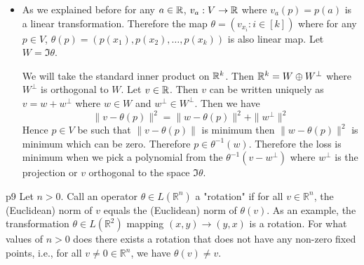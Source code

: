\documentclass[a4paper, 11pt]{article}
\newcounter{problem}
\begin{document}
{\begin{itemize}
Now for any $a\in \bbR$, consider the map $v_a: V\to \bbR$ where $v_a(p)=p(a)$. Now for any $p,q\in V$, $v_a(p+q)=(p+q)(a)=p(a)+q(a)=v_a(p)+v_a(q)$. Therefore $v_a$ is a linear map. Now the consider the map $\theta:V\to\bbR^k$ where $$\theta(p)=(v_{x_i}(p)\colon i\in [k])$$Therefore $\theta$ is also a linear map between the vector spaces $V$ and $\bbR^k$.

 Suppose all the values are 0. Then the set of polynomials of $V$ for which the loss function is 0 is  exactly the polynomials whose evaluations at $x_i$ is 0 for all $i\in[k]$. Hence the set of polynomials in $V$ for which the loss function is 0 is $\ker \theta$. Since $\ker\theta$ is a subspace of $V$
 \item As we explained before for any  $a\in \bbR$, $v_a:V\to \bbR$ where $v_a(p)=p(a)$ is a linear transformation. Therefore the map $\theta=(v_{x_i}\colon i\in [k])$ where for any $p\in V$, $\theta(p)=(p(x_1),p(x_2),\dots, p(x_k))$ is also linear map. Let $W=\Im \theta$.\parinn
 
 We will take the standard inner product on $\bbR^k$. Then $\mathbb{R}^k=W\oplus W^{\perp}$ where $W^{\perp}$ is orthogonal to $W$. Let $v\in \mathbb{R}$. Then $v$ can be written uniquely as $v=w+w^{\perp}$ where $w\in W$ and $w^{\perp}\in W^{\perp}$. Then we have $$\|v-\theta(p)\|^2=\|w-\theta(p)\|^2+\|w^{\perp}\|^2$$Hence $p\in V$ be such that  $\|v-\theta(p)\|$ is minimum then $\|w-\theta(p)\|^2$ is minimum which can be zero. Therefore $p\in\theta^{-1}(w)$. Therefore the loss is minimum when we pick a polynomial from the $\theta^{-1}(v-w^{\perp})$ where $w^{\perp}$ is the  projection or $v$ orthogonal to the space $\Im\theta$. 
\end{itemize}
}

\begin{problem}{%
	}{p9%
	}
Let $n>0$. Call an operator $\theta \in L\left(\mathbb{R}^n\right)$ a "rotation" if for all $v \in \mathbb{R}^n$, the (Euclidean) norm of $v$ equals the (Euclidean) norm of $\theta(v)$. As an example, the transformation $\theta \in L\left(\mathbb{R}^2\right)$ mapping $(x, y) \rightarrow(y, x)$ is a rotation. For what values of $n>0$ does there exists a rotation that does not have any non-zero fixed points, i.e., for all $v \neq 0 \in \mathbb{R}^n$, we have $\theta(v) \neq v$.
\end{problem}
\parinf
\end{document}
